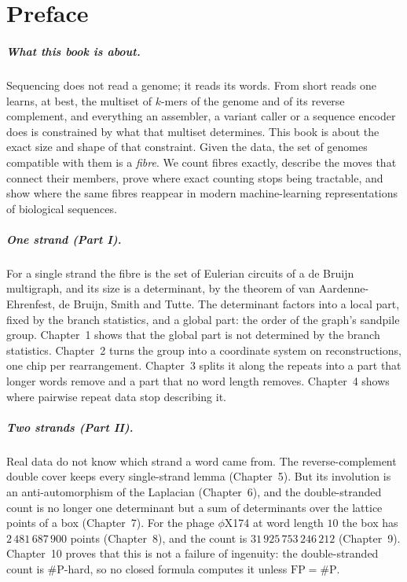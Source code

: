 \chapter*{Preface}

\paragraph{What this book is about.} Sequencing does not read a genome; it reads its words. From
short reads one learns, at best, the multiset of $k$-mers of the genome and of its reverse
complement, and everything an assembler, a variant caller or a sequence encoder does is constrained
by what that multiset determines. This book is about the exact size and shape of that constraint.
Given the data, the set of genomes compatible with them is a \emph{fibre}. We count fibres exactly,
describe the moves that connect their members, prove where exact counting stops being tractable, and
show where the same fibres reappear in modern machine-learning representations of biological
sequences.

\paragraph{One strand (Part I).} For a single strand the fibre is the set of Eulerian circuits of a
de Bruijn multigraph, and its size is a determinant, by the theorem of van Aardenne-Ehrenfest,
de Bruijn, Smith and Tutte. The determinant factors into a local part, fixed by the branch
statistics, and a global part: the order of the graph's sandpile group. Chapter~1 shows that the
global part is not determined by the branch statistics. Chapter~2 turns the group into a coordinate
system on reconstructions, one chip per rearrangement. Chapter~3 splits it along the repeats into a
part that longer words remove and a part that no word length removes. Chapter~4 shows where pairwise
repeat data stop describing it.

\paragraph{Two strands (Part II).} Real data do not know which strand a word came from. The
reverse-complement double cover keeps every single-strand lemma (Chapter~5). But its involution is an
anti-automorphism of the Laplacian (Chapter~6), and the double-stranded count is no longer one
determinant but a sum of determinants over the lattice points of a box (Chapter~7). For the phage
$\phi$X174 at word length $10$ the box has $2\,481\,687\,900$ points (Chapter~8), and the count is
$31\,925\,753\,246\,212$ (Chapter~9). Chapter~10 proves that this is not a failure of ingenuity:
the double-stranded count is $\#$P-hard, so no closed formula computes it unless $\mathrm{FP}=\#\mathrm P$.

